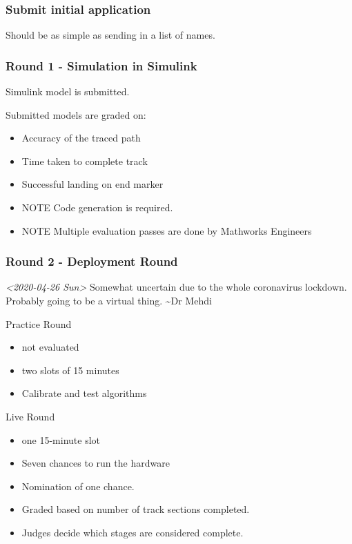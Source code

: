 \documentclass[unrestricted]{meetingnotesminutes}
\begin{document}
\subsubsection{Submit initial application}
\label{sec:org20b1d63}
Should be as simple as sending in a list of names.

\subsubsection{Round 1 - Simulation in Simulink}
\label{sec:org3e66579}
Simulink model is submitted.

Submitted models are graded on:
\begin{itemize}
\item Accuracy of the traced path
\item Time taken to complete track
\item Successful landing on end marker
\item NOTE Code generation is required.
\item NOTE Multiple evaluation passes are done by Mathworks Engineers
\end{itemize}

\subsubsection{Round 2 - Deployment Round}
\label{sec:org8a7296b}
\textit{<2020-04-26 Sun>}
Somewhat uncertain due to the whole coronavirus lockdown.
Probably going to be a virtual thing. \textasciitilde{}Dr Mehdi

Practice Round
\begin{itemize}
\item not evaluated
\item two slots of 15 minutes
\item Calibrate and test algorithms
\end{itemize}

Live Round
\begin{itemize}
\item one 15-minute slot
\item Seven chances to run the hardware
\item Nomination of one chance.
\item Graded based on number of track sections completed.
\item Judges decide which stages are considered complete.
\end{itemize}
\end{document}
